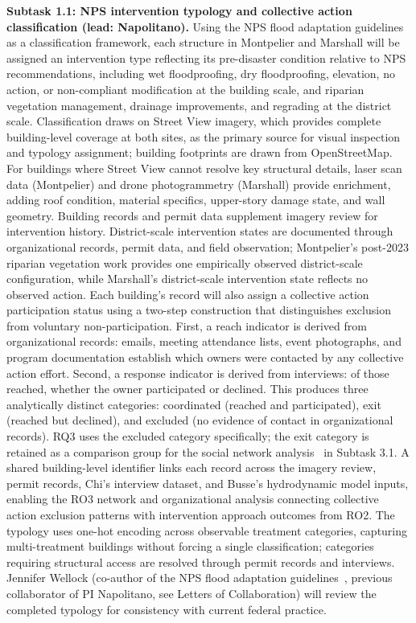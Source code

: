 \documentclass[11pt]{article}
\begin{document}
\textbf{Subtask 1.1: NPS intervention typology and collective action classification (lead: Napolitano).}
Using the NPS flood adaptation guidelines as a classification framework, each structure
in Montpelier and Marshall will be assigned an intervention type reflecting its
pre-disaster condition relative to NPS recommendations, including wet floodproofing,
dry floodproofing, elevation, no action, or non-compliant modification at the building
scale, and riparian vegetation management, drainage improvements, and regrading at the
district scale.
Classification draws on Street View imagery, which provides complete building-level
coverage at both sites, as the primary source for visual inspection and typology
assignment; building footprints are drawn from OpenStreetMap.
For buildings where Street View cannot resolve key structural details, laser scan data
(Montpelier) and drone photogrammetry (Marshall) provide enrichment, adding roof
condition, material specifics, upper-story damage state, and wall geometry.
Building records and permit data supplement imagery review for intervention history.
District-scale intervention states are documented through organizational records,
permit data, and field observation; Montpelier's post-2023 riparian vegetation work
provides one empirically observed district-scale configuration, while Marshall's
district-scale intervention state reflects no observed action.
Each building's record will also assign a collective action participation status
using a two-step construction that distinguishes exclusion from voluntary
non-participation.
First, a reach indicator is derived from organizational records: emails, meeting
attendance lists, event photographs, and program documentation establish which
owners were contacted by any collective action effort.
Second, a response indicator is derived from interviews: of those reached, whether
the owner participated or declined.
This produces three analytically distinct categories: coordinated (reached and
participated), exit (reached but declined), and excluded (no evidence of contact
in organizational records).
RQ3 uses the excluded category specifically; the exit category is retained as a
comparison group for the social network analysis~\cite{scott2012social} in Subtask 3.1.
A shared building-level identifier links each record across the imagery review,
permit records, Chi's interview dataset, and Busse's hydrodynamic model inputs,
enabling the RO3 network and organizational analysis connecting collective action
exclusion patterns with intervention approach outcomes from RO2.
The typology uses one-hot encoding across observable treatment categories, capturing
multi-treatment buildings without forcing a single classification; categories
requiring structural access are resolved through permit records and interviews.
Jennifer Wellock (co-author of the NPS flood adaptation guidelines~\cite{NPS2021},
previous collaborator of PI Napolitano, see Letters of Collaboration)
will review the completed typology for consistency with current federal practice.
\end{document}
